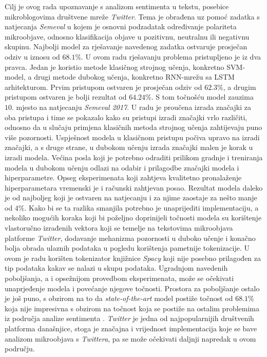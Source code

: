 \documentclass[times, utf8, zavrsni]{fer}
\begin{document}
Cilj je ovog rada upoznavanje s analizom sentimenta u tekstu, posebice mikroblogovima društvene mreže \emph{Twitter}. Tema je obrađena uz pomoć zadatka s natjecanja \emph{Semeval} u kojem je osnovni podzadatak određivanje polariteta mikroobjave, odnosno klasifikacija objave u pozitivnu, neutralnu ili negativnu skupinu. Najbolji model za rješavanje navedenog zadatka ostvaruje prosječan odziv u iznosu od $68.1\%$. U ovom radu rješavanju problema pristupljeno je iz dva pravca. Jedan je koristio metode klasičnog strojnog učenja, konkretno \gls{SVM}-model, a drugi metode dubokog učenja, konkretno \gls{RNN}-mrežu sa \gls{LSTM} arhitekturom. Prvim pristupom ostvaren je prosječan odziv od $62.3\%$, a drugim pristupom ostvaren je bolji rezultat od $64.24\%$. S tom točnošću model zauzima $10.$ mjesto na natjecanju \emph{Semeval 2017}. U radu je proučena izrada značajki za oba pristupa i time se pokazalo kako su pristupi izradi značajki vrlo različiti, odnosno da u slučaju primjena klasičnih metoda strojnog učenja zahtijevaju puno više pozornosti. Uspješnost modela u klasičnom pristupu počiva upravo na izradi značajki, a s druge strane, u dubokom učenju izrada značajki malen je korak u izradi modela. Većina posla koji je potrebno odraditi prilikom gradnje i treniranja modela u dubokom učenju odlazi na odabir i prilagodbe značajki modela i hiperparametre. Opseg eksperimenata koji zahtjeva kvalitetno pronalaženje hiperparametara vremenski je i računski zahtjevan posao. Rezultat modela daleko je od najboljeg koji je ostvaren na natjecanju i za njime zaostaje za nešto manje od $4\%$. Kako bi se ta razlika smanjila potrebno je unaprijediti implementaciju, a nekoliko mogućih koraka koji bi poželjno doprinijeli točnosti modela su korištenje vlastoručno izrađenih vektora koji se temelje na tekstovima mikroobjava platforme \emph{Twitter}, dodavanje mehanizma pozornosti u duboko učenje i konačno bolja obrada ulaznih podataka u pogledu korištenja pametnije tokenizacije. U ovom je radu korišten tokenizator knjižnice \emph{Spacy} koji nije posebno prilagođen za tip podataka kakav se nalazi u skupu podataka. Ugradnjom navedenih poboljšanja, a i opsežnijom provedbom eksperimenata, može se očekivati unaprjeđenje modela i povećanje njegove točnosti.
Prostora za poboljšanje ostalo je još puno, s obzirom na to da \emph{state-of-the-art} model postiže točnost od $68.1\%$ koja nije impresivna s obzirom na točnost koja se postiže na ostalim problemima iz područja analize sentimenta \citep{losirez}. \emph{Twitter} je jedna od najpopularnijih društvenih platforma današnjice, stoga je značajna i vrijednost implementacija koje se bave analizom mikroobjava s \emph{Twittera}, pa se može očekivati daljnji napredak u ovom području.
\end{document}
